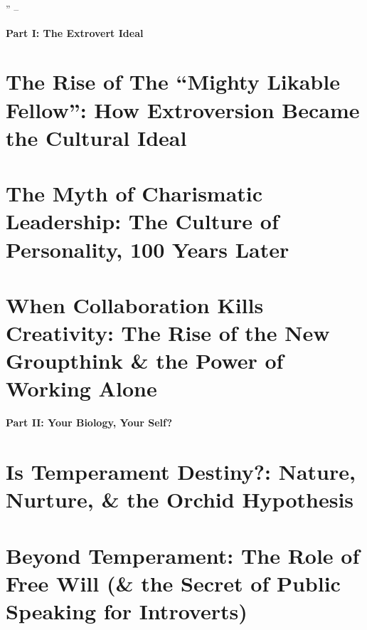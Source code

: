 \documentclass{article}
\numberwithin{equation}{section}
\begin{document}
'' -- \cite[pp. 13--]{Cain2013}


\begin{center}\LARGE\sf
	\textbf{Part I: The Extrovert Ideal}
\end{center}

\section{The Rise of The ``Mighty Likable Fellow'': How Extroversion Became the Cultural Ideal}


\section{The Myth of Charismatic Leadership: The Culture of Personality, 100 Years Later}


\section{When Collaboration Kills Creativity: The Rise of the New Groupthink \& the Power of Working Alone}


\begin{center}\LARGE\sf
	\textbf{Part II: Your Biology, Your Self?}
\end{center}

\section{Is Temperament Destiny?: Nature, Nurture, \& the Orchid Hypothesis}


\section{Beyond Temperament: The Role of Free Will (\& the Secret of Public Speaking for Introverts)}

\end{document}
